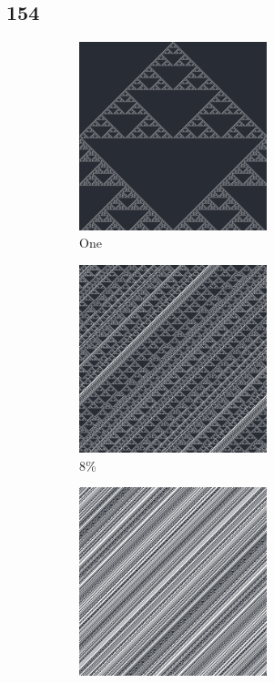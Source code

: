 \documentclass[12pt, fleqn]{report}                             %
\theoremstyle{break}                                            %
\begin{document}
      \subsection{154}
      \begin{figure}[ht!]
        \centering
        \begin{subfigure}[b]{0.4\linewidth}
          \includegraphics[width=0.6\textwidth]{Images/154/a.png}
          \caption{One}
        \end{subfigure}
        \begin{subfigure}[b]{0.4\linewidth}
          \includegraphics[width=0.6\textwidth]{Images/154/b.png}
          \caption{8\%}
        \end{subfigure}
        \begin{subfigure}[b]{0.4\linewidth}
          \includegraphics[width=0.6\textwidth]{Images/154/c.png}

\end{subfigure}
\end{figure}
\end{document}
